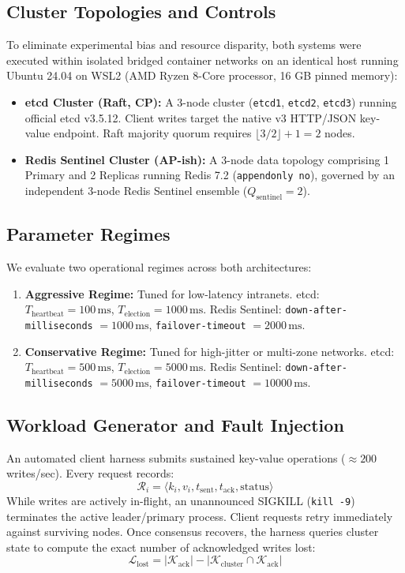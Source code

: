\documentclass[conference]{IEEEtran}
\begin{document}
\subsection{Cluster Topologies and Controls}
To eliminate experimental bias and resource disparity, both systems were executed within isolated bridged container networks on an identical host running Ubuntu 24.04 on WSL2 (AMD Ryzen 8-Core processor, 16 GB pinned memory):
\begin{itemize}
    \item \textbf{etcd Cluster (Raft, CP):} A 3-node cluster (\texttt{etcd1}, \texttt{etcd2}, \texttt{etcd3}) running official etcd v3.5.12. Client writes target the native v3 HTTP/JSON key-value endpoint. Raft majority quorum requires $\lfloor 3/2 \rfloor + 1 = 2$ nodes.
    \item \textbf{Redis Sentinel Cluster (AP-ish):} A 3-node data topology comprising 1 Primary and 2 Replicas running Redis 7.2 (\texttt{appendonly no}), governed by an independent 3-node Redis Sentinel ensemble ($Q_{\text{sentinel}} = 2$).
\end{itemize}

\subsection{Parameter Regimes}
We evaluate two operational regimes across both architectures:
\begin{enumerate}
    \item \textbf{Aggressive Regime:} Tuned for low-latency intranets. etcd: $T_{\text{heartbeat}} = 100\,\text{ms}$, $T_{\text{election}} = 1000\,\text{ms}$. Redis Sentinel: \texttt{down-after-milliseconds} $= 1000\,\text{ms}$, \texttt{failover-timeout} $= 2000\,\text{ms}$.
    \item \textbf{Conservative Regime:} Tuned for high-jitter or multi-zone networks. etcd: $T_{\text{heartbeat}} = 500\,\text{ms}$, $T_{\text{election}} = 5000\,\text{ms}$. Redis Sentinel: \texttt{down-after-milliseconds} $= 5000\,\text{ms}$, \texttt{failover-timeout} $= 10000\,\text{ms}$.
\end{enumerate}

\subsection{Workload Generator and Fault Injection}
An automated client harness submits sustained key-value operations ($\approx 200$ writes/sec). Every request records:
\begin{equation}
\mathcal{R}_i = \langle k_i, v_i, t_{\text{sent}}, t_{\text{ack}}, \text{status} \rangle
\end{equation}
While writes are actively in-flight, an unannounced SIGKILL (\texttt{kill -9}) terminates the active leader/primary process. Client requests retry immediately against surviving nodes. Once consensus recovers, the harness queries cluster state to compute the exact number of acknowledged writes lost:
\begin{equation}
\mathcal{L}_{\text{lost}} = |\mathcal{K}_{\text{ack}}| - |\mathcal{K}_{\text{cluster}} \cap \mathcal{K}_{\text{ack}}|
\end{equation}
\end{document}
